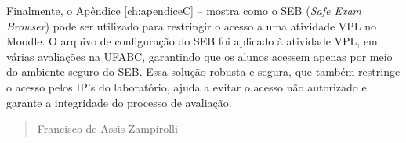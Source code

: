 Finalmente, o Apêndice \ref{ch:apendiceC} --  mostra como o SEB (\textit{Safe Exam Browser}) pode ser utilizado para restringir o acesso a uma atividade VPL no Moodle. O arquivo de configuração do SEB foi aplicado à atividade VPL, em várias avaliações na UFABC, garantindo que os alunos acessem apenas por meio do ambiente seguro do SEB. Essa solução robusta e segura, que também restringe o acesso pelos IP's do laboratório, ajuda a evitar o acesso não autorizado e garante a integridade do processo de avaliação.


\begin{verse}
    \vspace*{2mm}
	\begin{flushright}
		Francisco de Assis Zampirolli\\
            \date{\today}
	\end{flushright}
\end{verse}

